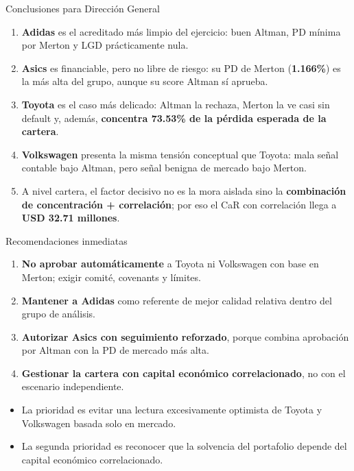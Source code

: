 \documentclass[aspectratio=169,10pt]{beamer}
\newcommand{\smallhead}[1]{\vspace{0.08cm}{\color{udlapblue}\textbf{#1}}\par\vspace{0.02cm}}
\begin{document}
\begin{frame}{Conclusiones para Dirección General}
\small
\begin{enumerate}
  \item \textbf{Adidas} es el acreditado más limpio del ejercicio: buen Altman, PD mínima por Merton y LGD prácticamente nula.
  \item \textbf{Asics} es financiable, pero no libre de riesgo: su PD de Merton (\textbf{1.166\%}) es la más alta del grupo, aunque su score Altman sí aprueba.
  \item \textbf{Toyota} es el caso más delicado: Altman la rechaza, Merton la ve casi sin default y, además, \textbf{concentra 73.53\% de la pérdida esperada de la cartera}.
  \item \textbf{Volkswagen} presenta la misma tensión conceptual que Toyota: mala señal contable bajo Altman, pero señal benigna de mercado bajo Merton.
  \item A nivel cartera, el factor decisivo no es la mora aislada sino la \textbf{combinación de concentración + correlación}; por eso el CaR con correlación llega a \textbf{USD 32.71 millones}.
\end{enumerate}
\end{frame}

\begin{frame}{Recomendaciones inmediatas}
\footnotesize
\begin{enumerate}
  \item \textbf{No aprobar automáticamente} a Toyota ni Volkswagen con base en Merton; exigir comité, covenants y límites.
  \item \textbf{Mantener a Adidas} como referente de mejor calidad relativa dentro del grupo de análisis.
  \item \textbf{Autorizar Asics con seguimiento reforzado}, porque combina aprobación por Altman con la PD de mercado más alta.
  \item \textbf{Gestionar la cartera con capital económico correlacionado}, no con el escenario independiente.
\end{enumerate}

\vspace{0.18cm}
\smallhead{Sentido directivo}
\begin{itemize}
  \item La prioridad es evitar una lectura excesivamente optimista de Toyota y Volkswagen basada solo en mercado.
  \item La segunda prioridad es reconocer que la solvencia del portafolio depende del capital económico correlacionado.
\end{itemize}
\end{frame}
\end{document}
